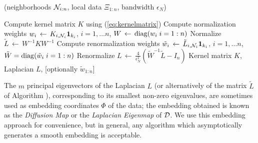 %
\begin{algorithm}[H]
\renewcommand{\thealgorithm}{}
\caption{(neighborhoods ${\cal N}_{i:n}$, local data $\Xi_{1:n}$, bandwidth $\epsilon_N$)}
\begin{algorithmic}[1]
  \STATE Compute kernel matrix $K$ using (\ref{eq:kernelmatrix})
  \STATE Compute normalization weights $w_{i}\,\gets\,  K_{i, {\cal N}_i} \bm{1}_{k_i} $, $i=1,\ldots n$,  $W\,\gets\,\operatorname{diag}(w_{i} \; {i=1:n})$
  \STATE Normalize $\tilde{L}\,\gets\, W^{-1}K W^{-1} $
  \STATE Compute renormalization weights $\tilde w_i\,\gets\,  \tilde{L}_{i, {\cal N}_i} \bm{1}_{k_i}$, $i=1,\ldots n$, $\tilde W=\operatorname{diag}( \tilde w_i \;{i=1:n})$
  \STATE Renormalize $L\,\gets\,\frac{4}{ \epsilon_N^2}({\tilde W }^{-1} \tilde L - I_n)$
   Kernel matrix $K$, Laplacian $L$, [optionally $\tilde{w}_{1:n}$]
\end{algorithmic}
\end{algorithm}
%
The $m$ principal eigenvectors of the Laplacian $L$ (or alternatively
of the matrix $\tilde{L}$ of Algorithm \lapalg), corresponding to its
smallest non-zero eigenvalues, are sometimes used as embedding coordinates
$\Phi$ of the data; the embedding obtained is known as the {\em
  Diffusion Map} \citep{coifman:06} or the {\em Laplacian Eigenmap} \citep{belkin:01} of
${\cal D}$.  We use this embedding approach for convenience, but in
general, any algorithm which asymptotically generates a smooth
embedding is acceptable.


